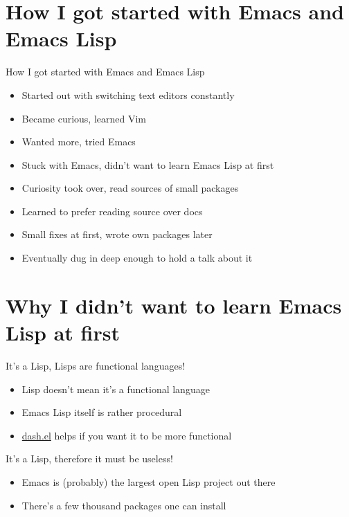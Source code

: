 \documentclass[presentation]{beamer}
\begin{document}
\section{How I got started with Emacs and Emacs Lisp}
\label{sec-2}

\begin{frame}[label=sec-2-1]{How I got started with Emacs and Emacs Lisp}
\begin{itemize}
\item Started out with switching text editors constantly
\item Became curious, learned Vim
\item Wanted more, tried Emacs
\item Stuck with Emacs, didn't want to learn Emacs Lisp at first
\item Curiosity took over, read sources of small packages
\item Learned to prefer reading source over docs
\item Small fixes at first, wrote own packages later
\item Eventually dug in deep enough to hold a talk about it
\end{itemize}
\end{frame}

\section{Why I didn't want to learn Emacs Lisp at first}
\label{sec-3}

\begin{frame}[label=sec-3-1]{It's a Lisp, Lisps are functional languages!}
\begin{itemize}
\item Lisp doesn't mean it's a functional language
\item Emacs Lisp itself is rather procedural
\item \href{https://github.com/magnars/dash.el}{dash.el} helps if you want it to be more functional
\end{itemize}
\end{frame}

\begin{frame}[label=sec-3-2]{It's a Lisp, therefore it must be useless!}
\begin{itemize}
\item Emacs is (probably) the largest open Lisp project out there
\item There's a few thousand packages one can install
\end{itemize}
\end{frame}
\end{document}
